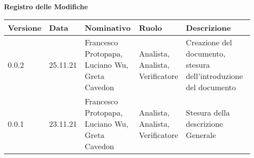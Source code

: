 {\LARGE{\textbf{Registro delle Modifiche}}} \\

\begin{tabular}{|m{}<{\centering}|m{}<{\centering}|m{}<{\centering}|m{}<{\centering}|m{}<{\centering}|}
	\hline \rowcolor{azzurro_scuro!70}
	\textbf{Versione}&\textbf{Data}&\textbf{Nominativo}&\textbf{Ruolo}&\textbf{Descrizione}\\
	\hline
	0.0.2&25.11.21&\shortstack {Francesco Protopapa,\\Luciano Wu,\\Greta Cavedon}&\shortstack{Analista,\\Analista,\\Verificatore}&Creazione del documento, stesura dell’introduzione del documento\\ 
	\hline \rowcolor{azzurro_chiaro!30}
	0.0.1&23.11.21&\shortstack{Francesco Protopapa,\\Luciano Wu,\\Greta Cavedon}&\shortstack{Analista,\\Analista,\\Verificatore}&Stesura della descrizione Generale\\
	\hline
\end{tabular}